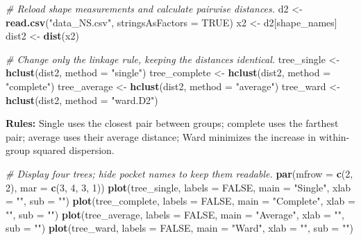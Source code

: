 \documentclass[
  10pt,
]{article}
\newenvironment{Shaded}{\begin{snugshade}}{\end{snugshade}}
\newcommand{\AttributeTok}[1]{\textcolor[rgb]{0.13,0.29,0.53}{#1}}
\newcommand{\CommentTok}[1]{\textcolor[rgb]{0.56,0.35,0.01}{\textit{#1}}}
\newcommand{\ConstantTok}[1]{\textcolor[rgb]{0.56,0.35,0.01}{#1}}
\newcommand{\DecValTok}[1]{\textcolor[rgb]{0.00,0.00,0.81}{#1}}
\newcommand{\FunctionTok}[1]{\textcolor[rgb]{0.13,0.29,0.53}{\textbf{#1}}}
\newcommand{\NormalTok}[1]{#1}
\newcommand{\OtherTok}[1]{\textcolor[rgb]{0.56,0.35,0.01}{#1}}
\newcommand{\StringTok}[1]{\textcolor[rgb]{0.31,0.60,0.02}{#1}}
\begin{document}
\begin{Shaded}
\begin{Highlighting}[]
\CommentTok{\# Reload shape measurements and calculate pairwise distances.}
\NormalTok{d2 }\OtherTok{\textless{}{-}} \FunctionTok{read.csv}\NormalTok{(}\StringTok{"data\_NS.csv"}\NormalTok{, }\AttributeTok{stringsAsFactors =} \ConstantTok{TRUE}\NormalTok{)}
\NormalTok{x2 }\OtherTok{\textless{}{-}}\NormalTok{ d2[shape\_names]}
\NormalTok{dist2 }\OtherTok{\textless{}{-}} \FunctionTok{dist}\NormalTok{(x2)}

\CommentTok{\# Change only the linkage rule, keeping the distances identical.}
\NormalTok{tree\_single }\OtherTok{\textless{}{-}} \FunctionTok{hclust}\NormalTok{(dist2, }\AttributeTok{method =} \StringTok{"single"}\NormalTok{)}
\NormalTok{tree\_complete }\OtherTok{\textless{}{-}} \FunctionTok{hclust}\NormalTok{(dist2, }\AttributeTok{method =} \StringTok{"complete"}\NormalTok{)}
\NormalTok{tree\_average }\OtherTok{\textless{}{-}} \FunctionTok{hclust}\NormalTok{(dist2, }\AttributeTok{method =} \StringTok{"average"}\NormalTok{)}
\NormalTok{tree\_ward }\OtherTok{\textless{}{-}} \FunctionTok{hclust}\NormalTok{(dist2, }\AttributeTok{method =} \StringTok{"ward.D2"}\NormalTok{)}
\end{Highlighting}
\end{Shaded}

\textbf{Rules:} Single uses the closest pair between groups; complete
uses the farthest pair; average uses their average distance; Ward
minimizes the increase in within-group squared dispersion.

\begin{Shaded}
\begin{Highlighting}[]
\CommentTok{\# Display four trees; hide pocket names to keep them readable.}
\FunctionTok{par}\NormalTok{(}\AttributeTok{mfrow =} \FunctionTok{c}\NormalTok{(}\DecValTok{2}\NormalTok{, }\DecValTok{2}\NormalTok{), }\AttributeTok{mar =} \FunctionTok{c}\NormalTok{(}\DecValTok{3}\NormalTok{, }\DecValTok{4}\NormalTok{, }\DecValTok{3}\NormalTok{, }\DecValTok{1}\NormalTok{))}
\FunctionTok{plot}\NormalTok{(tree\_single, }\AttributeTok{labels =} \ConstantTok{FALSE}\NormalTok{, }\AttributeTok{main =} \StringTok{"Single"}\NormalTok{, }\AttributeTok{xlab =} \StringTok{""}\NormalTok{, }\AttributeTok{sub =} \StringTok{""}\NormalTok{)}
\FunctionTok{plot}\NormalTok{(tree\_complete, }\AttributeTok{labels =} \ConstantTok{FALSE}\NormalTok{, }\AttributeTok{main =} \StringTok{"Complete"}\NormalTok{, }\AttributeTok{xlab =} \StringTok{""}\NormalTok{, }\AttributeTok{sub =} \StringTok{""}\NormalTok{)}
\FunctionTok{plot}\NormalTok{(tree\_average, }\AttributeTok{labels =} \ConstantTok{FALSE}\NormalTok{, }\AttributeTok{main =} \StringTok{"Average"}\NormalTok{, }\AttributeTok{xlab =} \StringTok{""}\NormalTok{, }\AttributeTok{sub =} \StringTok{""}\NormalTok{)}
\FunctionTok{plot}\NormalTok{(tree\_ward, }\AttributeTok{labels =} \ConstantTok{FALSE}\NormalTok{, }\AttributeTok{main =} \StringTok{"Ward"}\NormalTok{, }\AttributeTok{xlab =} \StringTok{""}\NormalTok{, }\AttributeTok{sub =} \StringTok{""}\NormalTok{)}
\end{Highlighting}
\end{Shaded}
\end{document}
